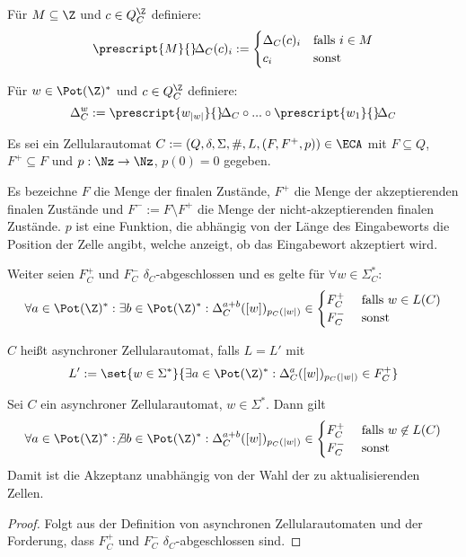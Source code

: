 
\begin{definition}
    Für $M \subseteq \Z$ und $c \in Q_C^\Z$ definiere:
    \[
         \prescript{M}{} \! \Delta_C(c)_i :=
         \begin{cases}
            \Delta_C(c)_i & \text{falls }i \in M \\
            c_i & \text{sonst}
         \end{cases}
    \]
    
    Für $w \in \Pot({\Z})^*$ und $c \in Q_C^\Z$ definiere:
    \[
        \Delta^w_C := \prescript{w_{|w|}}{} \! \Delta_C \circ ... \circ \prescript{w_1}{} \! \Delta_C
    \]
\end{definition}

\begin{definition}
    Es sei ein Zellularautomat $C := (Q, \delta, \Sigma, \#, L, (F, F^+, p)) \in \ECA$
    mit $F \subseteq Q$, $F^+ \subseteq F$ und $p : \Nz \to \Nz$, $p(0) = 0$ gegeben.

    Es bezeichne $F$ die Menge der finalen Zustände, $F^+$ die Menge der akzeptierenden finalen Zustände und
    $F^- := F \setminus F^+$ die Menge der nicht-akzeptierenden finalen Zustände.
    $p$ ist eine Funktion, die abhängig von der Länge des Eingabeworts die Position der Zelle
    angibt, welche anzeigt, ob das Eingabewort akzeptiert wird.
    
    Weiter seien $F^+_C$ und $F^-_C$ $\delta_C$-abgeschlossen und es gelte für $\forall w \in \Sigma_C^*$:
    \[
        \forall a \in \Pot({\Z})^*: \exists b \in \Pot({\Z})^*:
            \Delta^{a+b}_C([w])_{{p_C}(|w|)} \in
            \begin{cases}
                F_C^+ & \text{ falls } w \in L(C) \\ 
                F_C^- & \text{ sonst }
            \end{cases}
    \]
    
    $C$ heißt asynchroner Zellularautomat, falls $L = L'$ mit
    \[
        L' := \set{ w \in \Sigma^* }{ \exists a \in \Pot({\Z})^*: \Delta^{a}_C([w])_{{p_C}(|w|)} \in F_C^+  }
    \]
\end{definition}


\begin{proposition}
    Sei $C$ ein asynchroner Zellularautomat, $w \in \Sigma^*$.
    Dann gilt 
    \[
            \forall a \in \Pot({\Z})^*: \not\exists b \in \Pot({\Z})^*:
            \Delta^{a+b}_C([w])_{{p_C}(|w|)} \in
            \begin{cases}
                F_C^+ & \text{ falls } w \not\in L(C) \\ 
                F_C^- & \text{ sonst }
            \end{cases}
    \]
    Damit ist die Akzeptanz unabhängig von der Wahl der zu aktualisierenden Zellen.
\end{proposition}
\begin{proof}
    Folgt aus der Definition von asynchronen Zellularautomaten und der Forderung, dass $F^+_C$ und $F^-_C$ $\delta_C$-abgeschlossen sind.
\end{proof}


